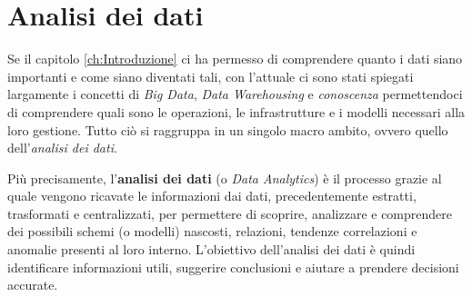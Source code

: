 \section{Analisi dei dati}

Se il capitolo \ref{ch:Introduzione} ci ha permesso di comprendere quanto i dati siano importanti e come siano diventati tali, con l'attuale ci sono stati spiegati largamente i concetti di \textit{Big Data}, \textit{Data Warehousing} e \textit{conoscenza} permettendoci di comprendere quali sono le operazioni, le infrastrutture e i modelli necessari alla loro gestione. Tutto ciò si raggruppa in un singolo macro ambito, ovvero quello dell'\textit{analisi dei dati}.

Più precisamente, l'\textbf{analisi dei dati} (o \textit{Data Analytics}) è il processo grazie al quale vengono ricavate le informazioni dai dati, precedentemente estratti, trasformati e centralizzati, per permettere di scoprire, analizzare e comprendere dei possibili schemi (o modelli) nascosti, relazioni, tendenze correlazioni e anomalie presenti al loro interno. L'obiettivo dell'analisi dei dati è quindi identificare informazioni utili, suggerire conclusioni e aiutare a prendere decisioni accurate.\cite{talend_data_analytics}

